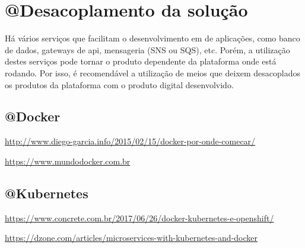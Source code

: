 \chapter{@Desacoplamento da solução}\label{desacoplamento-da-solucao}


Há vários serviços que facilitam o desenvolvimento em de aplicações, como banco de dados,
gateways de api, mensageria (SNS ou SQS), etc. Porém, a utilização destes serviços pode
tornar o produto dependente da plataforma onde está rodando. Por isso, é recomendável
a utilização de meios que deixem desacoplados os produtos da plataforma com o produto
digital desenvolvido.

\section{@Docker}

\url{http://www.diego-garcia.info/2015/02/15/docker-por-onde-comecar/}

\url{https://www.mundodocker.com.br}

\section{@Kubernetes}

\url{https://www.concrete.com.br/2017/06/26/docker-kubernetes-e-openshift/}

\url{https://dzone.com/articles/microservices-with-kubernetes-and-docker}

